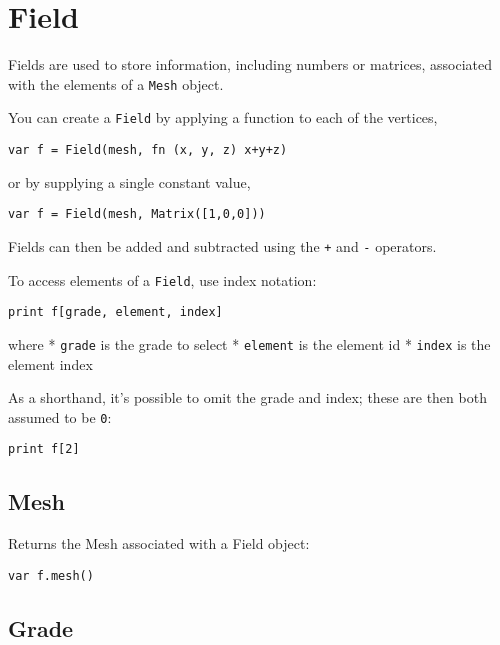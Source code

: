 \hypertarget{field}{%
\section{Field}\label{field}}

Fields are used to store information, including numbers or matrices,
associated with the elements of a \texttt{Mesh} object.

You can create a \texttt{Field} by applying a function to each of the
vertices,

\begin{lstlisting}
var f = Field(mesh, fn (x, y, z) x+y+z)
\end{lstlisting}

or by supplying a single constant value,

\begin{lstlisting}
var f = Field(mesh, Matrix([1,0,0]))
\end{lstlisting}

Fields can then be added and subtracted using the \texttt{+} and
\texttt{-} operators.

To access elements of a \texttt{Field}, use index notation:

\begin{lstlisting}
print f[grade, element, index]
\end{lstlisting}

where * \texttt{grade} is the grade to select * \texttt{element} is the
element id * \texttt{index} is the element index

As a shorthand, it's possible to omit the grade and index; these are
then both assumed to be \texttt{0}:

\begin{lstlisting}
print f[2]
\end{lstlisting}

\hypertarget{mesh}{%
\subsection{Mesh}\label{mesh}}

Returns the Mesh associated with a Field object:

\begin{lstlisting}
var f.mesh() 
\end{lstlisting}

\hypertarget{grade}{%
\subsection{Grade}\label{grade}}

